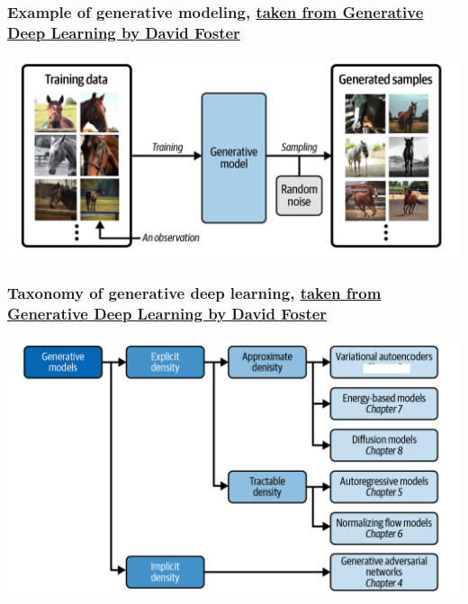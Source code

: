\documentclass{beamer}
\begin{document}
\begin{frame}
\frametitle{Example of generative modeling, \href{{https://www.oreilly.com/library/view/generative-deep-learning/9781098134174/ch01.html}}{taken from Generative Deep Learning by David Foster}}

\vspace{6mm}

\centerline{\includegraphics[width=1.0\linewidth]{figures/generativelearning.png}}

\vspace{6mm}
\end{frame}

\begin{frame}
\frametitle{Taxonomy of generative deep learning, \href{{https://www.oreilly.com/library/view/generative-deep-learning/9781098134174/ch01.html}}{taken from Generative Deep Learning by David Foster}}

\vspace{6mm}

\centerline{\includegraphics[width=1.0\linewidth]{figures/generativemodels.png}}

\vspace{6mm}
\end{frame}
\end{document}
